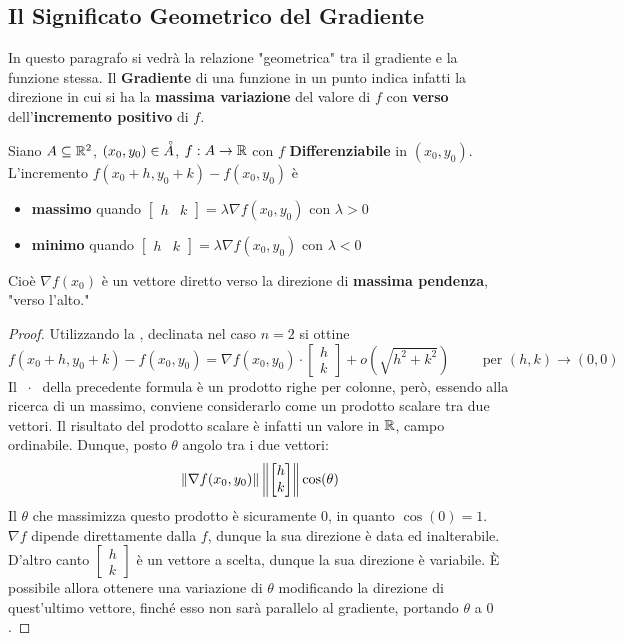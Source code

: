 \subsection{Il Significato Geometrico del Gradiente}
In questo paragrafo si vedrà la relazione "geometrica" tra il gradiente e la funzione stessa. Il \textbf{Gradiente} di una funzione in un punto indica infatti la direzione in cui si ha la \textbf{massima variazione} del valore di $f$ con \textbf{verso} dell'\textbf{incremento positivo} di $f$.
\begin{proposition}
	Siano $A \subseteq \mathbb{R}^2$, $(x_0, y_0) \in \accentset{\circ}{A}$, $f: A \to \mathbb{R}$ con $f$ \textbf{Differenziabile} in $(x_0, y_0)$.\\
	L'incremento $f(x_0 + h, y_0 + k) - f(x_0, y_0)$ è
	\begin{itemize}[noitemsep]
		\item \textbf{massimo} quando $\begin{bmatrix}h & k\end{bmatrix} = \lambda \nabla f(x_0, y_0)$ con $\lambda > 0$
		\item \textbf{minimo} quando $\begin{bmatrix}h & k\end{bmatrix} = \lambda \nabla f(x_0, y_0)$ con $\lambda < 0$
	\end{itemize}
	Cioè $\nabla f(x_0)$ è un vettore diretto verso la direzione di \textbf{massima pendenza}, "verso l'alto."
	\begin{proof}
		Utilizzando la , declinata nel caso $n = 2$ si ottine
		\begin{equation}
			\label{eq:dim_dir_grad}
			f(x_0 + h, y_0 + k) -
			f(x_0, y_0) =
			\nabla f(x_0, y_0) \cdot
			\begin{bmatrix}
				h\\k
			\end{bmatrix} +
			o(\sqrt{h^2 + k^2})
			\qquad \text{ per } (h,k) \to (0,0)
		\end{equation}
		Il $\;\cdot\;$ della precedente formula è un prodotto righe per colonne, però, essendo alla ricerca di un massimo, conviene considerarlo come un prodotto scalare tra due vettori. Il risultato del prodotto scalare è infatti un valore in $\mathbb{R}$, campo ordinabile. Dunque, posto $\theta$ angolo tra i due vettori:
		\[\left\|\nabla f(x_0, y_0)\right\| \left\|\begin{bmatrix}h\\k\end{bmatrix}\right\| \cos(\theta)\]
		Il $\theta$ che massimizza questo prodotto è sicuramente $0$, in quanto $\cos(0) = 1$.\\
		$\nabla f$ dipende direttamente dalla $f$, dunque la sua direzione è data ed inalterabile. D'altro canto $\begin{bmatrix}h\\k\end{bmatrix}$ è un vettore a scelta, dunque la sua direzione è variabile. È possibile allora ottenere una variazione di $\theta$ modificando la direzione di quest'ultimo vettore, finché esso non sarà parallelo al gradiente, portando $\theta$ a $0$.


\end{proof}
\end{proposition}
